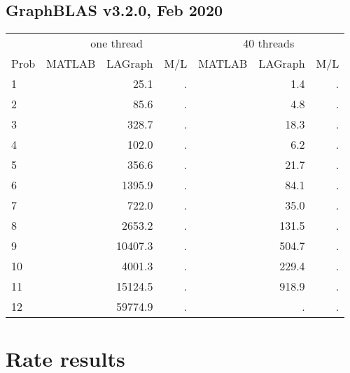 \documentclass[12pt]{article}
\begin{document}
\subsection{GraphBLAS v3.2.0, Feb 2020}

{\small
\begin{tabular}{l|rr|r||rr|r}
\hline
     & \multicolumn{3}{c}{one thread}                &  \multicolumn{3}{c}{40 threads}  \\
Prob & MATLAB         & LAGraph        & M/L         &   MATLAB      & LAGraph       & M/L        \\
\hline
  1  &                &          25.1  &      .      &               &          1.4  &      .     \\
  2  &                &          85.6  &      .      &               &          4.8  &      .     \\
  3  &                &         328.7  &      .      &               &         18.3  &      .     \\
\hline
  4  &                &         102.0  &      .      &               &          6.2  &      .     \\
  5  &                &         356.6  &      .      &               &         21.7  &      .     \\
  6  &                &        1395.9  &      .      &               &         84.1  &      .     \\
\hline
  7  &                &         722.0  &      .      &               &         35.0  &      .     \\
  8  &                &        2653.2  &      .      &               &        131.5  &      .     \\
  9  &                &       10407.3  &      .      &               &        504.7  &      .     \\
\hline
 10  &                &        4001.3  &      .      &               &        229.4  &      .     \\
 11  &                &       15124.5  &      .      &               &        918.9  &      .     \\
 12  &                &       59774.9  &      .      &               &           .   &      .     \\
\end{tabular}
}

\newpage
\section{Rate results}
\end{document}
